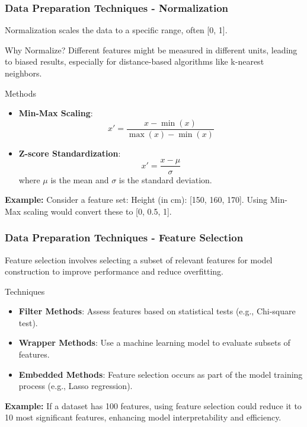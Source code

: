 \documentclass{beamer}
\begin{document}
\begin{frame}[fragile]
    \frametitle{Data Preparation Techniques - Normalization}
    Normalization scales the data to a specific range, often [0, 1].
    
    \begin{block}{Why Normalize?}
        Different features might be measured in different units, leading to biased results, especially for distance-based algorithms like k-nearest neighbors.
    \end{block}

    \begin{block}{Methods}
        \begin{itemize}
            \item \textbf{Min-Max Scaling}:
            \begin{equation}
            x' = \frac{x - \min(x)}{\max(x) - \min(x)}
            \end{equation}
            \item \textbf{Z-score Standardization}:
            \begin{equation}
            x' = \frac{x - \mu}{\sigma}
            \end{equation}
            where $\mu$ is the mean and $\sigma$ is the standard deviation.
        \end{itemize}
    \end{block}
    
    \textbf{Example:} Consider a feature set: Height (in cm): [150, 160, 170]. Using Min-Max scaling would convert these to [0, 0.5, 1].
\end{frame}

\begin{frame}[fragile]
    \frametitle{Data Preparation Techniques - Feature Selection}
    Feature selection involves selecting a subset of relevant features for model construction to improve performance and reduce overfitting.
    
    \begin{block}{Techniques}
        \begin{itemize}
            \item \textbf{Filter Methods}: Assess features based on statistical tests (e.g., Chi-square test).
            \item \textbf{Wrapper Methods}: Use a machine learning model to evaluate subsets of features.
            \item \textbf{Embedded Methods}: Feature selection occurs as part of the model training process (e.g., Lasso regression).
        \end{itemize}
    \end{block}

    \textbf{Example:} If a dataset has 100 features, using feature selection could reduce it to 10 most significant features, enhancing model interpretability and efficiency.
\end{frame}
\end{document}
